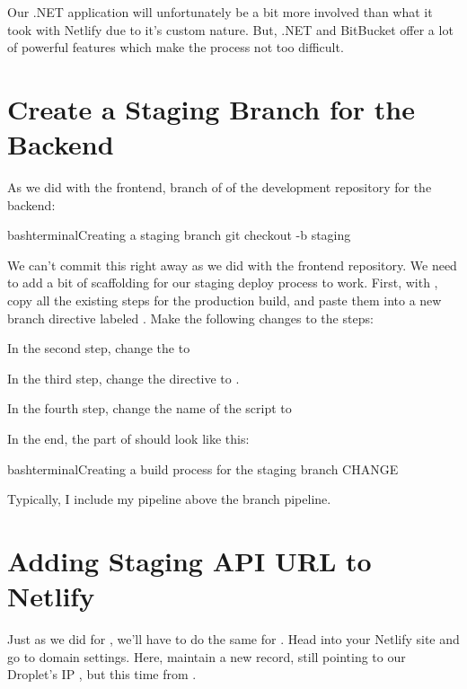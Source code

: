 \documentclass[a4paper,headinclude=on,footinclude=on,12pt,oneside]{scrbook}
\begin{document}
Our .NET application will unfortunately be a bit more involved than what it took with Netlify due to it's custom nature. But, .NET and BitBucket offer a lot of powerful features which make the process not too difficult.

\section{Create a Staging Branch for the Backend}

As we did with the frontend, branch of of the development repository for the backend:

\begin{codeInput}{bash}{terminal}{Creating a staging branch}
git checkout -b staging
\end{codeInput}

We can't commit this right away as we did with the frontend repository. We need to add a bit of scaffolding for our staging deploy process to work. First, with , copy all the existing steps for the production build, and paste them into a new branch directive labeled . Make the following changes to the steps:

\begin{arrows}
\item In the second step, change the  to 
\item In the third step, change the  directive to . 
\item In the fourth step, change the name of the script  to 
\end{arrows}

In the end, the  part of  should look like this:

\begin{codeInput}{bash}{terminal}{Creating a build process for the staging branch}
CHANGE
\end{codeInput}

Typically, I include my  pipeline above the  branch pipeline.

\section{Adding Staging API URL to Netlify}

Just as we did for , we'll have to do the same for . Head into your Netlify site and go to domain settings. Here, maintain a new  record, still pointing to our Droplet's IP , but this time from .
\end{document}
